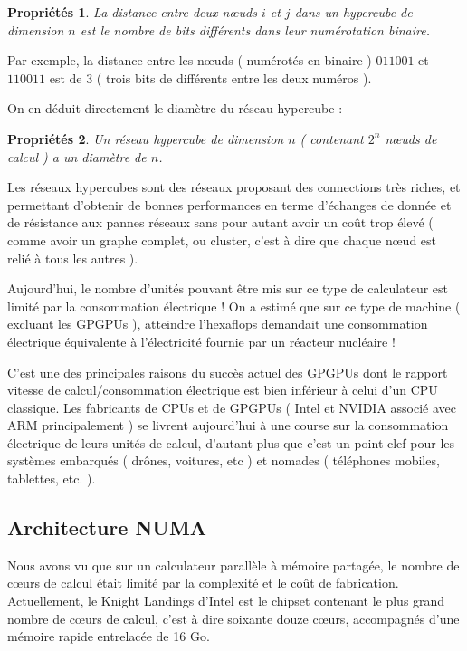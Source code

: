 \documentclass[fleqn,11pt]{article}
\newtheorem{prop}{Propriétés }
\begin{document}
\begin{itemize}
\begin{itemize}
\begin{prop}
La distance entre deux nœuds $i$ et $j$ dans un hypercube de dimension $n$ est le nombre de bits différents
dans leur numérotation binaire.
\end{prop}

Par exemple, la distance entre les nœuds ( numérotés en binaire ) $011001$ et $110011$ est de 3 ( trois bits
de différents entre les deux numéros ).

On en déduit directement le diamètre du réseau hypercube :

\begin{prop}
Un réseau hypercube de dimension $n$ ( contenant $2^{n}$ nœuds de calcul ) a un diamètre de $n$.
\end{prop}

Les réseaux hypercubes sont des réseaux proposant des connections très riches,
et permettant d'obtenir de bonnes performances en terme d'échanges de donnée
et de résistance aux pannes réseaux sans pour autant avoir un coût trop élevé 
( comme avoir un graphe complet, ou cluster, c'est à dire que chaque nœud est relié à tous les autres ).

\end{itemize}


Aujourd'hui, le nombre d'unités pouvant être mis sur ce type de calculateur 
est limité par la consommation électrique !  
On a estimé que sur ce type de machine ( excluant les GPGPUs ), atteindre l'hexaflops demandait une consommation  électrique équivalente à l'électricité fournie par un réacteur nucléaire ! 

C'est une des principales raisons du succès actuel des GPGPUs  dont le rapport vitesse de calcul/consommation électrique est bien inférieur à celui d'un CPU classique. Les fabricants de CPUs et de GPGPUs ( Intel et NVIDIA associé avec ARM principalement ) se livrent aujourd'hui à une course sur la consommation électrique de leurs unités de calcul, d'autant plus que c'est un point clef pour les systèmes embarqués  
( drônes, voitures, etc ) et nomades ( téléphones mobiles, tablettes, etc. ).

\end{itemize}

\subsection{Architecture NUMA}

Nous avons vu que sur un calculateur parallèle à mémoire partagée,  le nombre de cœurs de calcul était limité par la complexité et le coût de fabrication. 
Actuellement, le Knight Landings d'Intel est le chipset contenant le plus grand nombre de cœurs de calcul, c'est à dire soixante douze c{\oe}urs, accompagnés d'une mémoire rapide entrelacée de 16 Go.
\end{document}
